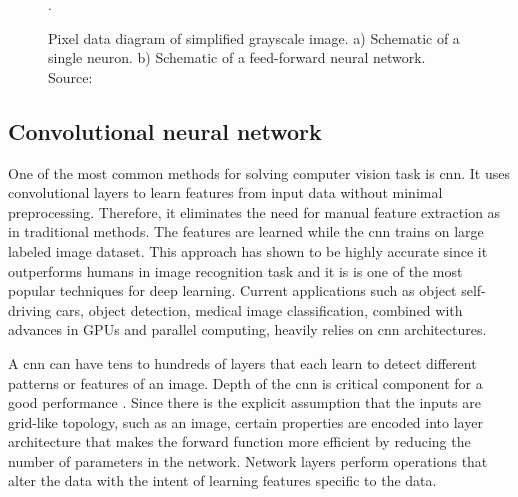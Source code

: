             \begin{figure}[ht]
                \centering
                \qquad
                \caption{Pixel data diagram of simplified grayscale image. a) Schematic of a single neuron. b) Schematic of a feed-forward neural network. Source: \cite{nnfurtado}}.
                \label{fig:neuron and neural network}
            \end{figure}
            
    \subsection{Convolutional neural network}
        One of the most common methods for solving computer vision task is \gls{cnn}. It uses convolutional layers to learn features from input data without minimal preprocessing. Therefore, it eliminates the need for manual feature extraction as in traditional methods. The features are learned while the \gls{cnn} trains on large labeled image dataset. This approach has shown to be highly accurate since it outperforms humans in image recognition task \cite{russakovsky2015imagenet} and it is is one of the most popular techniques for deep learning. Current applications such as object self-driving cars, object detection, medical image classification, combined with advances in GPUs and parallel computing, heavily relies on \gls{cnn} architectures. 

        A \gls{cnn} can have tens to hundreds of layers that each learn to detect different patterns or features of an image. Depth of the \gls{cnn} is critical component for a good performance \cite{russakovsky2015imagenet}. Since there is the explicit assumption that the inputs are grid-like topology, such as an image, certain properties are encoded into layer architecture that makes the forward function more efficient by reducing the number of parameters in the network. Network layers perform operations that alter the data with the intent of learning features specific to the data. 
        
